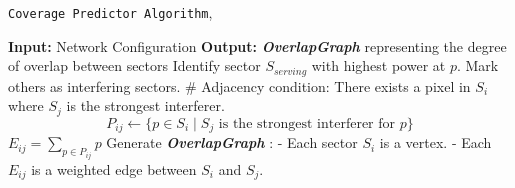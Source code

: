 \begin{algorithm}
    \caption{
        \texttt{Coverage Predictor Algorithm},
    }
    \begin{algorithmic} [1]
            \Statex \textbf{Input:} Network Configuration 
            \Statex \textbf{Output:} \textit{\textbf{OverlapGraph}} representing the degree of overlap between sectors
                \State Identify sector $S_{serving}$ with highest power at $p$.
                \State Mark others as interfering sectors.
            \EndFor
                    \Statex \# Adjacency condition: There exists a pixel in $S_i$ where $S_j$ is the strongest interferer.
                        \State \[ P_{ij} \gets \{p \in S_i \mid S_j \text{ is the strongest interferer for } p\} \]
                        \State $E_{ij} = \sum_{p \in P_{ij}} p$    
                    \EndIf
                \EndFor
            \EndFor
            \State Generate \textit{\textbf{OverlapGraph}} :
                \Statex \quad - Each sector $S_i$ is a vertex.
                \Statex \quad - Each $E_{ij}$ is a weighted edge between $S_i$ and $S_j$.
        \EndFunction
    \end{algorithmic}
    \label{alg:coverage_algo}
\end{algorithm}
